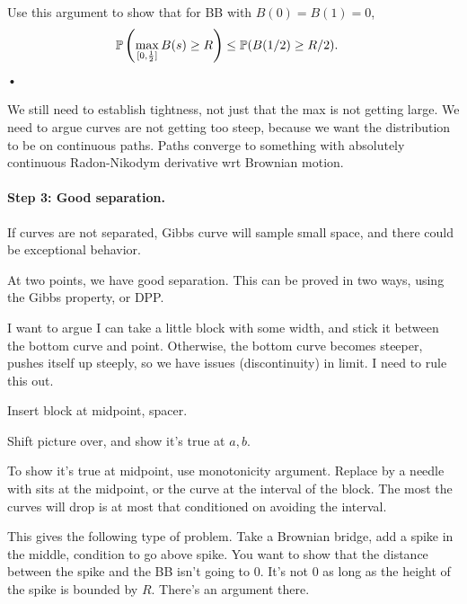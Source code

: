 \begin{exr}
Use this argument to show that for BB with $B(0)=B(1)=0$, 
\begin{align*}
\mathbb{P}\left( {\max_{[0,\frac{1}{2}]} B(s)\ge R} \right)&\le \mathbb{P}(B(1/2)\ge R/2).
\end{align*}•
\end{exr}


We still need to establish tightness, not just that the max is not getting large. We need to argue curves are not getting too steep, because we want the distribution to be on continuous paths. 
Paths converge to something with absolutely continuous Radon-Nikodym derivative wrt Brownian motion.

\paragraph{Step 3: Good separation.}

If curves are not separated, Gibbs curve will sample small space, and there could be exceptional behavior.


At two points, we have good separation.
This can be proved in two ways, using the Gibbs property, or DPP.

I want to argue I can take a little block with some width, and stick it between the bottom curve and point. 
Otherwise, the bottom curve becomes steeper, pushes itself up steeply, so we have issues (discontinuity) in limit. I need to rule this out.

Insert block at midpoint, spacer.

Shift picture over, and show it's true at $a,b$.

To show it's true at midpoint, use monotonicity argument.
Replace by a needle with sits at the midpoint, or the curve at the interval of the block.
The most the curves will drop is at most that conditioned on avoiding the interval. 

This gives the following type of problem. 
Take a Brownian bridge, add a spike in the middle, condition to go above spike. You want to show that the distance between the spike and the BB isn't going to 0. It's not 0 as long as the height of the spike is bounded by $R$.
There's an argument there. 

